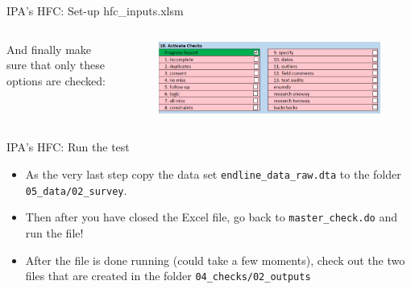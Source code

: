 \documentclass[aspectratio=169]{beamer}
\begin{document}
\begin{frame}{IPA's HFC: Set-up hfc\_inputs.xlsm}
	\begin{columns}[c]
		
		\small And finally make sure that only these options are checked:
		
		\begin{figure}
			\centering
			\includegraphics[width=\linewidth]{img/ipacheck-setup-4.png}
		\end{figure}
	\end{columns}
\end{frame}

\begin{frame}{IPA's HFC: Run the test}

	\begin{itemize}
		\item As the very last step copy the data set \texttt{endline\_data\_raw.dta} to the folder \texttt{05\_data/02\_survey}. 
		\item Then after you have closed the Excel file, go back to \texttt{master\_check.do} and run the file!
		\item After the file is done running (could take a few moments), check out the two files that are created in the folder \texttt{04\_checks/02\_outputs}
	\end{itemize}
\end{frame}
\end{document}

